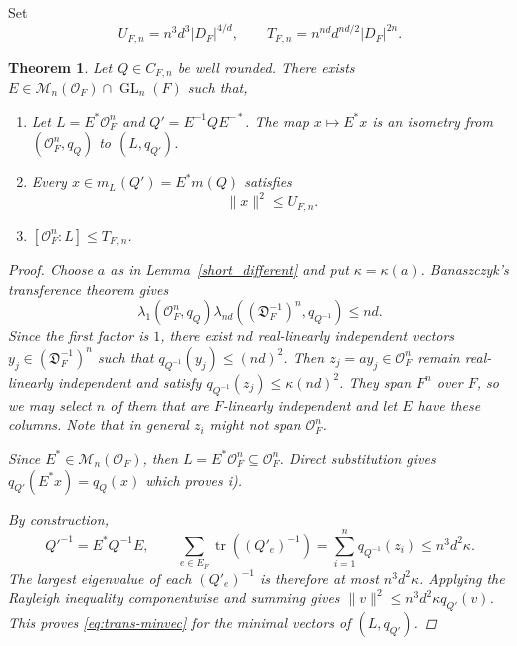 \documentclass[11pt,a4paper,twoside]{amsart}
\theoremstyle{plain}
\newtheorem{theorem}{\bfseries Theorem}[section]
\theoremstyle{definition}
\newcommand{\rint}[0]{\mathcal{O}_F}
\newcommand{\disc}[0]{D_F}
\newcommand{\Codiff}{\mathfrak D_F^{-1}}
\renewcommand{\leq}{\leqslant}
\begin{document}
Set
$$U_{F,n}=n^3d^3|\disc|^{4/d},\qquad T_{F,n}=n^{nd}d^{nd/2}|\disc|^{2n}.$$
\begin{theorem}\label{Bound_Hermitian_min_vec}
Let $Q\in C_{F,n}$ be well rounded. There exists $E\in\mathcal M_n(\rint)\cap\operatorname{GL}_n(F)$ such that,
\begin{enumerate}[label = \roman*)]
    \item Let $L = E^*\rint^n$ and $Q' = E^{-1}QE^{-*}$. The map $x\mapsto E^*x$ is an isometry from $(\rint^n,q_Q)$ to $(L,q_{Q'})$.
    \item Every $x\in m_L(Q') = E^* m(Q)$ satisfies
\begin{equation}\label{eq:trans-minvec}
\|x\|^2\leq U_{F,n}.
\end{equation}
\item $[\rint^n:L]\leq T_{F,n}$.
\end{enumerate}
\begin{proof}
Choose $a$ as in Lemma~\ref{short_different} and put $\kappa=\kappa(a)$. Banaszczyk’s transference theorem \cite[Theorem~2.1]{transference} gives
$$\lambda_1(\rint^n,q_Q)\lambda_{nd}((\Codiff)^n,q_{Q^{-1}})\leq nd.$$
Since the first factor is $1$, there exist $nd$ real-linearly independent vectors $y_j\in(\Codiff)^n$ such that $q_{Q^{-1}}(y_j)\leq(nd)^2$. Then $z_j=ay_j\in\rint^n$ remain real-linearly independent and satisfy $q_{Q^{-1}}(z_j)\leq\kappa(nd)^2$. They span $F^n$ over $F$, so we may select $n$ of them that are $F$-linearly independent and let $E$ have these columns. Note that in general $z_i$ might not span $\rint^n$.



Since $E^*\in\mathcal{M}_n(\rint)$, then $L=E^*\rint^n\subseteq\rint^n$. Direct substitution gives $q_{Q'}(E^*x)=q_Q(x)$ which proves i).

By construction,
$$Q'^{-1}=E^*Q^{-1}E,\qquad \sum_{e\in E_F}\operatorname{tr}((Q'_e)^{-1})=\sum_{i=1}^nq_{Q^{-1}}(z_i)\leq n^3d^2\kappa.$$
The largest eigenvalue of each $(Q'_e)^{-1}$ is therefore at most $n^3d^2\kappa$. Applying the Rayleigh inequality componentwise and summing gives $\|v\|^2\leq n^3d^2\kappa q_{Q'}(v)$. This proves \eqref{eq:trans-minvec} for the minimal vectors of $(L,q_{Q'})$.


\end{proof}
\end{theorem}
\end{document}
